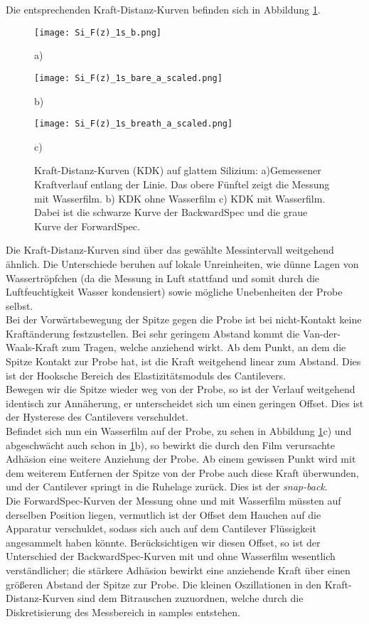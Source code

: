 Die entsprechenden Kraft-Distanz-Kurven befinden sich in Abbildung \ref{fig:Si_force-distance}.
\begin{figure}[h]
\centering
	\begin{minipage}{0.3\textwidth}
	\centering
		\texttt{[image: Si\_F(z)\_1s\_b.png]}
		\caption*{a)}
	\end{minipage}
	\hfill
	\begin{minipage}{0.3\textwidth}
	\centering
		\texttt{[image: Si\_F(z)\_1s\_bare\_a\_scaled.png]}
		\caption*{b)}
	\end{minipage}
	\hfill
	\begin{minipage}{0.3\textwidth}
	\centering
		\texttt{[image: Si\_F(z)\_1s\_breath\_a\_scaled.png]}
		\caption*{c)}
	\end{minipage}
	\caption[Kraft-Distanz-Kurven auf glattem Silizium]{Kraft-Distanz-Kurven (KDK) auf glattem Silizium: a)Gemessener Kraftverlauf entlang der Linie. Das obere Fünftel zeigt die Messung mit Wasserfilm. b) KDK ohne Wasserfilm c) KDK mit Wasserfilm. Dabei ist die schwarze Kurve der BackwardSpec und die graue Kurve der ForwardSpec.}
	\label{fig:Si_force-distance}
\end{figure}
Die Kraft-Distanz-Kurven sind über das gewählte Messintervall weitgehend ähnlich. Die Unterschiede beruhen auf lokale Unreinheiten, wie dünne Lagen von Wassertröpfchen (da die Messung in Luft stattfand und somit durch die Luftfeuchtigkeit Wasser kondensiert) sowie mögliche Unebenheiten der Probe selbst.\\ 
Bei der Vorwärtsbewegung der Spitze gegen die Probe ist bei nicht-Kontakt keine Kraftänderung festzustellen. Bei sehr geringem Abstand kommt die Van-der-Waals-Kraft zum Tragen, welche anziehend wirkt. Ab dem Punkt, an dem die Spitze Kontakt zur Probe hat, ist die Kraft weitgehend linear zum Abstand. Dies ist der Hooksche Bereich des Elastizitätsmoduls des Cantilevers.\\
Bewegen wir die Spitze wieder weg von der Probe, so ist der Verlauf weitgehend identisch zur Annäherung, er unterscheidet sich um einen geringen Offset. Dies ist der Hysterese des Cantilevers verschuldet.\\
Befindet sich nun ein Wasserfilm auf der Probe, zu sehen in Abbildung \ref{fig:Si_force-distance}c) und abgeschwächt auch schon in \ref{fig:Si_force-distance}b), so bewirkt die durch den Film verursachte Adhäsion eine weitere Anziehung der Probe. Ab einem gewissen Punkt wird mit dem weiterem Entfernen der Spitze von der Probe auch diese Kraft überwunden, und der Cantilever springt in die Ruhelage zurück. Dies ist der \emph{snap-back}.\\
Die ForwardSpec-Kurven der Messung ohne und mit Wasserfilm müssten auf derselben Position liegen, vermutlich ist der Offset dem Hauchen auf die Apparatur verschuldet, sodass sich auch auf dem Cantilever Flüssigkeit angesammelt haben könnte.
Berücksichtigen wir diesen Offset, so ist der Unterschied der BackwardSpec-Kurven mit und ohne Wasserfilm wesentlich verständlicher; die stärkere Adhäsion bewirkt eine anziehende Kraft über einen größeren Abstand der Spitze zur Probe.
Die kleinen Oszillationen in den Kraft-Distanz-Kurven sind dem Bitrauschen zuzuordnen, welche durch die Diskretisierung des Messbereich in samples entstehen.
